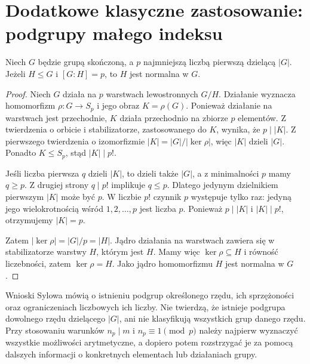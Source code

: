 \section{Dodatkowe klasyczne zastosowanie: podgrupy małego indeksu}
\begin{twierdzenie}
\label{aa:tw:index-minprime}
Niech $G$ będzie grupą skończoną, a $p$ najmniejszą liczbą
pierwszą dzielącą $|G|$. Jeżeli $H\le G$ i $[G:H]=p$,
to $H$ jest normalna w $G$.
\end{twierdzenie}
\begin{proof}
Niech $G$ działa na $p$ warstwach lewostronnych $G/H$.
Działanie wyznacza homomorfizm
$\rho:G\to S_p$ i jego obraz $K=\rho(G)$.
Ponieważ działanie na warstwach jest przechodnie,
$K$ działa przechodnio na zbiorze $p$ elementów.
Z twierdzenia o orbicie i stabilizatorze, zastosowanego do $K$,
wynika, że $p\mid|K|$.
Z pierwszego twierdzenia o izomorfizmie
$|K|=|G|/|\ker\rho|$, więc $|K|$ dzieli $|G|$.
Ponadto $K\le S_p$, stąd $|K|\mid p!$.

Jeśli liczba pierwsza $q$ dzieli $|K|$, to dzieli także
$|G|$, a z minimalności $p$ mamy $q\ge p$.
Z drugiej strony $q\mid p!$ implikuje $q\le p$.
Dlatego jedynym dzielnikiem pierwszym $|K|$ może być $p$.
W liczbie $p!$ czynnik $p$ występuje tylko raz:
jedyną jego wielokrotnością wśród $1,2,\ldots,p$
jest liczba $p$.
Ponieważ $p\mid |K|$ i $|K|\mid p!$,
otrzymujemy $|K|=p$.

Zatem $|\ker\rho|=|G|/p=|H|$.
Jądro działania na warstwach zawiera się w stabilizatorze
warstwy $H$, którym jest $H$.
Mamy więc $\ker\rho\subseteq H$ i równość liczebności,
zatem $\ker\rho=H$.
Jako jądro homomorfizmu $H$ jest normalna w $G$.
\end{proof}

\begin{uwaga}
Wnioski Sylowa mówią o istnieniu podgrup określonego rzędu,
ich sprzężoności oraz ograniczeniach liczbowych ich liczby.
Nie twierdzą, że istnieje podgrupa dowolnego rzędu dzielącego $|G|$,
ani nie klasyfikują wszystkich grup danego rzędu.
Przy stosowaniu warunków $n_p\mid m$ i $n_p\equiv1\pmod p$
należy najpierw wyznaczyć wszystkie możliwości arytmetyczne,
a dopiero potem rozstrzygać je za pomocą dalszych informacji
o konkretnych elementach lub działaniach grupy.
\end{uwaga}
